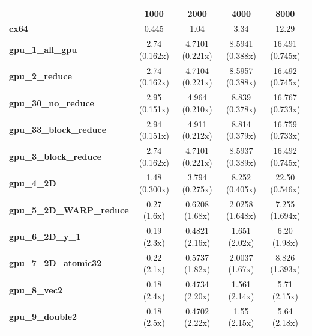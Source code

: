 \begin{table}[H]
    \centering
    \begin{tabular}{|l|c|c|c|c|}
        \hline
                                          & \textbf{1000} & \textbf{2000}   & \textbf{4000}   & \textbf{8000}   \\
        \hline
        \textbf{cx64}                     & 0.445         & 1.04            & 3.34            & 12.29           \\

        \textbf{gpu\_1\_all\_gpu}         & 2.74 (0.162x) & 4.7101 (0.221x) & 8.5941 (0.388x) & 16.491 (0.745x) \\

        \textbf{gpu\_2\_reduce}           & 2.74 (0.162x) & 4.7104 (0.221x) & 8.5957 (0.388x) & 16.492 (0.745x) \\

        \textbf{gpu\_30\_no\_reduce}      & 2.95 (0.151x) & 4.964 (0.210x)  & 8.839 (0.378x)  & 16.767 (0.733x) \\

        \textbf{gpu\_33\_block\_reduce}   & 2.94 (0.151x) & 4.911 (0.212x)  & 8.814 (0.379x)  & 16.759 (0.733x) \\

        \textbf{gpu\_3\_block\_reduce}    & 2.74 (0.162x) & 4.7101 (0.221x) & 8.5937 (0.389x) & 16.492 (0.745x) \\

        \textbf{gpu\_4\_2D}               & 1.48 (0.300x) & 3.794 (0.275x)  & 8.252 (0.405x)  & 22.50 (0.546x)  \\

        \textbf{gpu\_5\_2D\_WARP\_reduce} & 0.27 (1.6x)   & 0.6208 (1.68x)  & 2.0258 (1.648x) & 7.255 (1.694x)  \\

        \textbf{gpu\_6\_2D\_y\_1}         & 0.19 (2.3x)   & 0.4821 (2.16x)  & 1.651 (2.02x)   & 6.20 (1.98x)    \\

        \textbf{gpu\_7\_2D\_atomic32}     & 0.22 (2.1x)   & 0.5737 (1.82x)  & 2.0037 (1.67x)  & 8.826 (1.393x)  \\

        \textbf{gpu\_8\_vec2}             & 0.18 (2.4x)   & 0.4734 (2.20x)  & 1.561 (2.14x)   & 5.71 (2.15x)    \\

        \textbf{gpu\_9\_double2}          & 0.18 (2.5x)   & 0.4702 (2.22x)  & 1.55 (2.15x)    & 5.64 (2.18x)    \\


\end{tabular}
\end{table}
